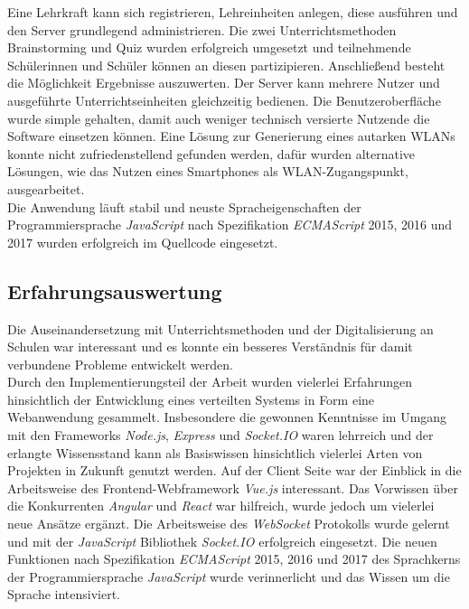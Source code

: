 Eine Lehrkraft kann sich registrieren, Lehreinheiten anlegen, diese ausführen und den Server grundlegend administrieren. Die zwei Unterrichtsmethoden Brainstorming und Quiz wurden erfolgreich  umgesetzt und teilnehmende Schülerinnen und Schüler können an diesen partizipieren. Anschließend besteht die Möglichkeit Ergebnisse auszuwerten. Der Server kann mehrere Nutzer und ausgeführte Unterrichtseinheiten gleichzeitig bedienen. Die Benutzeroberfläche wurde simple gehalten, damit auch weniger technisch versierte Nutzende  
die Software einsetzen können. 
Eine Lösung zur Generierung eines autarken WLANs konnte nicht zufriedenstellend gefunden werden, dafür wurden alternative Lösungen, wie das Nutzen eines Smartphones als WLAN-Zugangspunkt, ausgearbeitet. \\ 

Die Anwendung läuft stabil und neuste Spracheigenschaften der Programmiersprache \emph{JavaScript} nach Spezifikation \emph{ECMAScript} 2015, 2016 und 2017 wurden erfolgreich im Quellcode eingesetzt.

\subsection{Erfahrungsauswertung}\label{sec:erfahrungen}
Die Auseinandersetzung mit Unterrichtsmethoden und der Digitalisierung an 
Schulen war interessant und es konnte ein besseres Verständnis für damit verbundene Probleme entwickelt werden. \\ 

Durch den Implementierungsteil der Arbeit wurden vielerlei Erfahrungen hinsichtlich der Entwicklung eines verteilten Systems in Form eine Webanwendung gesammelt. Insbesondere die gewonnen Kenntnisse im Umgang mit den Frameworks \emph{Node.js}, \emph{Express} und \emph{Socket.IO} waren lehrreich und der erlangte Wissensstand kann als Basiswissen hinsichtlich vielerlei Arten von Projekten in Zukunft genutzt werden. Auf der Client Seite war der Einblick in die Arbeitsweise des Frontend-Webframework \emph{Vue.js} interessant. Das Vorwissen über die Konkurrenten \emph{Angular} und \emph{React} war hilfreich, wurde jedoch um vielerlei neue Ansätze ergänzt.
Die Arbeitsweise des \emph{WebSocket} Protokolls wurde gelernt und mit der \emph{JavaScript} Bibliothek \emph{Socket.IO} erfolgreich eingesetzt.
Die neuen Funktionen nach Spezifikation \emph{ECMAScript} 2015, 2016 und 2017 des Sprachkerns der Programmiersprache \emph{JavaScript} wurde verinnerlicht und das Wissen um die Sprache intensiviert.     
